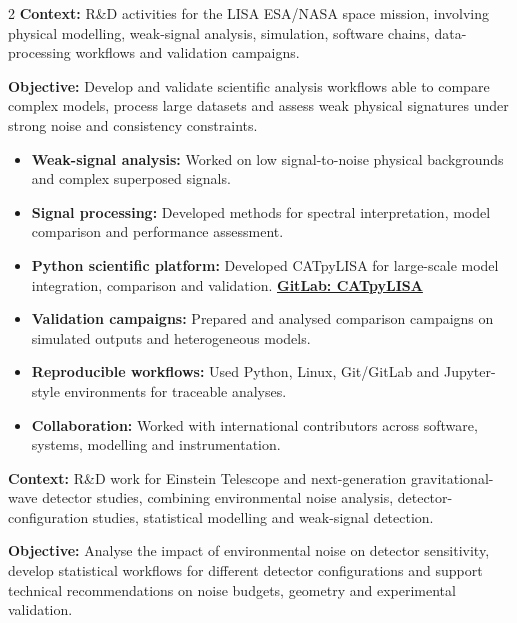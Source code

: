 \documentclass[8pt,a4paper,ragged2e,withhyper]{altacv}
\begin{document}
\begin{paracol}{2}
\textbf{Context:} R\&D activities for the LISA ESA/NASA space mission, involving physical modelling, weak-signal analysis, simulation, software chains, data-processing workflows and validation campaigns.

\textbf{Objective:} Develop and validate scientific analysis workflows able to compare complex models, process large datasets and assess weak physical signatures under strong noise and consistency constraints.

\begin{itemize}
  \item \textbf{Weak-signal analysis:} Worked on low signal-to-noise physical backgrounds and complex superposed signals.
  \item \textbf{Signal processing:} Developed methods for spectral interpretation, model comparison and performance assessment.
  \item \textbf{Python scientific platform:} Developed CATpyLISA for large-scale model integration, comparison and validation.
  \textcolor{DarkPastelRed}{\href{https://gitlab.oca.eu/gboileau/lisa_l3_tools}{\bf GitLab: CATpyLISA}}
  \item \textbf{Validation campaigns:} Prepared and analysed comparison campaigns on simulated outputs and heterogeneous models.
  \item \textbf{Reproducible workflows:} Used Python, Linux, Git/GitLab and Jupyter-style environments for traceable analyses.
  \item \textbf{Collaboration:} Worked with international contributors across software, systems, modelling and instrumentation.
\end{itemize}

\divider


\textbf{Context:} R\&D work for Einstein Telescope and next-generation gravitational-wave detector studies, combining environmental noise analysis, detector-configuration studies, statistical modelling and weak-signal detection.

\textbf{Objective:} Analyse the impact of environmental noise on detector sensitivity, develop statistical workflows for different detector configurations and support technical recommendations on noise budgets, geometry and experimental validation.


\end{paracol}
\end{document}

